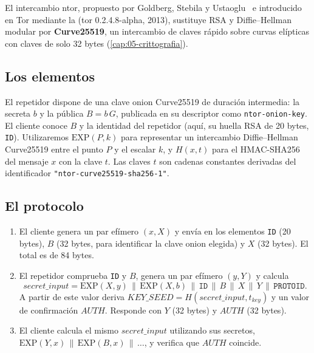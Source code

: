 El intercambio ntor, propuesto por Goldberg, Stebila y Ustaoglu~\cite{goldberg2013ntor} e introducido en Tor mediante la  (tor 0.2.4.8-alpha, 2013), sustituye RSA y Diffie--Hellman modular por \textbf{Curve25519}, un intercambio de claves rápido sobre curvas elípticas con claves de solo 32 bytes (\cref{cap:05-crittografia}).

\subsection{Los elementos}

El repetidor dispone de una clave onion Curve25519 de duración intermedia: la secreta $b$ y la pública $B = b\,G$, publicada en su descriptor como \texttt{ntor-onion-key}. El cliente conoce $B$ y la identidad del repetidor (aquí, su huella RSA de 20 bytes, \texttt{ID}). Utilizaremos $\mathrm{EXP}(P,k)$ para representar un intercambio Diffie--Hellman Curve25519 entre el punto $P$ y el escalar $k$, y $H(x,t)$ para el HMAC-SHA256 del mensaje $x$ con la clave $t$. Las claves $t$ son cadenas constantes derivadas del identificador \texttt{"ntor-curve25519-sha256-1"}.

\subsection{El protocolo}

\begin{enumerate}
  \item El cliente genera un par efímero $(x,X)$ y envía en  los elementos \texttt{ID} (20 bytes), $B$ (32 bytes, para identificar la clave onion elegida) y $X$ (32 bytes). El total es de 84 bytes.
  \item El repetidor comprueba \texttt{ID} y $B$, genera un par efímero $(y,Y)$ y calcula
  \[ \mathit{secret\_input} = \mathrm{EXP}(X, y) \,\|\, \mathrm{EXP}(X, b) \,\|\, \texttt{ID} \,\|\, B \,\|\, X \,\|\, Y \,\|\, \texttt{PROTOID}. \]
  A partir de este valor deriva $\mathit{KEY\_SEED} = H(\mathit{secret\_input}, t_{\mathit{key}})$ y un valor de confirmación $\mathit{AUTH}$. Responde con $Y$ (32 bytes) y $\mathit{AUTH}$ (32 bytes).
  \item El cliente calcula el mismo $\mathit{secret\_input}$ utilizando sus secretos, $\mathrm{EXP}(Y,x) \,\|\,\allowbreak \mathrm{EXP}(B,x) \,\|\, \ldots$, y verifica que $\mathit{AUTH}$ coincide.
\end{enumerate}

